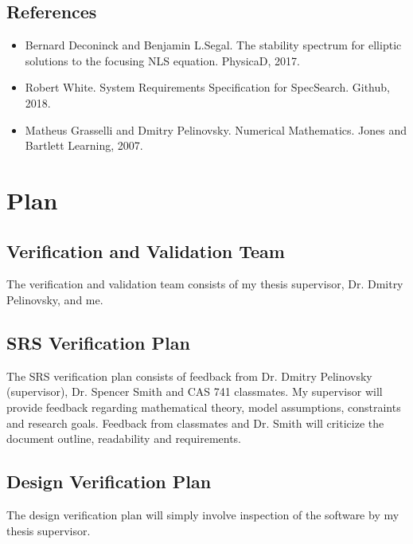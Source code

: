 \documentclass[12pt, titlepage]{article}
\begin{document}
\subsection{References}
\label{REF1}


\begin{itemize} 

	\item 	Bernard Deconinck and Benjamin L.Segal. 
	The stability spectrum for elliptic solutions to the focusing NLS equation. 
	PhysicaD, 2017.  
	\item Robert White. System Requirements Specification for SpecSearch. 
	Github, 2018.
	\item Matheus Grasselli and Dmitry Pelinovsky. Numerical Mathematics. Jones 
	and Bartlett Learning, 2007.
	
\end{itemize}

\section{Plan}
	 
\subsection{Verification and Validation Team}
\label{VnVTeam}
The verification and validation team consists of my thesis supervisor, Dr. 
Dmitry Pelinovsky, and me. \\

\subsection{SRS Verification Plan}
\label{SRSVerPlan}
The SRS verification plan consists of feedback from Dr. Dmitry Pelinovsky 
(supervisor), Dr. Spencer Smith and CAS 741 classmates. My supervisor will 
provide feedback regarding mathematical theory, model assumptions, constraints 
and research goals. Feedback from classmates and Dr. Smith will criticize the 
document outline, readability and requirements. 

\subsection{Design Verification Plan}
\label{DesignVerificationPlan}
The design verification plan will simply involve inspection of the software by 
my thesis supervisor.  
\end{document}
